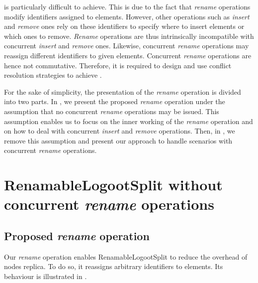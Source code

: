 \documentclass[10pt,journal,compsoc]{IEEEtran}
\begin{document}
 is particularly difficult to achieve.
This is due to the fact that \emph{rename} operations modify identifiers assigned to elements.
However, other operations such as \emph{insert} and \emph{remove} ones rely on these identifiers to specify where to insert elements or which ones to remove.
\emph{Rename} operations are thus intrinsically incompatible with concurrent \emph{insert} and \emph{remove} ones.
Likewise, concurrent \emph{rename} operations may reassign different identifiers to given elements.
Concurrent \emph{rename} operations are hence not commutative.
Therefore, it is required to design and use conflict resolution strategies to achieve .

For the sake of simplicity, the presentation of the \emph{rename} operation is divided into two parts.
In , we present the proposed \emph{rename} operation under the assumption that no concurrent \emph{rename} operations may be issued.
This assumption enables us to focus on the inner working of the \emph{rename} operation and on how to deal with concurrent \emph{insert} and \emph{remove} operations.
Then, in , we remove this assumption and present our approach to handle scenarios with concurrent \emph{rename} operations.

\section{RenamableLogootSplit without concurrent \emph{rename} operations}
\label{sec:centralised-rls}

\subsection{Proposed \emph{rename} operation}

\label{sec:rename-op}

Our \emph{rename} operation enables RenamableLogootSplit to reduce the overhead of nodes replica.
To do so, it reassigns arbitrary identifiers to elements.
Its behaviour is illustrated in .
\end{document}
